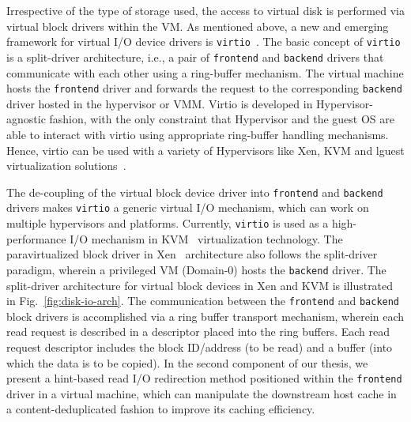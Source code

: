 Irrespective of the type of storage used, the access to virtual disk is
performed via virtual block drivers within the VM. 
As mentioned above, a new and emerging framework for 
virtual I/O device drivers is \texttt{virtio}~\cite{virtio}. 
The basic concept of \texttt{virtio} is a split-driver
architecture, i.e., a pair of \texttt{frontend} 
and \texttt{backend} drivers that communicate with each other using
a ring-buffer mechanism.
The virtual machine hosts the \texttt{frontend} driver and forwards the
request to the corresponding \texttt{backend} driver hosted in the 
hypervisor or VMM.
Virtio is developed in Hypervisor-agnostic fashion, with the only
constraint that Hypervisor and the guest OS are able to interact
with virtio using appropriate ring-buffer handling mechanisms.
Hence, virtio can be used
with a variety of Hypervisors like Xen, KVM and lguest virtualization 
solutions~\cite{virtio}.

The de-coupling of the virtual block device driver 
into \texttt{frontend} and \texttt{backend} drivers
makes \texttt{virtio}
a generic virtual I/O mechanism, which can work on multiple hypervisors
and platforms. Currently, \texttt{virtio} is used as a high-performance
I/O mechanism in KVM~\cite{kvm} virtualization technology. 
The paravirtualized block driver in Xen~\cite{xen} architecture also follows
the split-driver paradigm, wherein a privileged VM (Domain-0) hosts the 
\texttt{backend} driver. The split-driver architecture for virtual block devices
in Xen and KVM is illustrated in Fig.~\ref{fig:disk-io-arch}.
The communication between the \texttt{frontend} and \texttt{backend} block drivers is 
accomplished via a ring buffer transport mechanism, wherein each read
request is described in a descriptor placed into the ring buffers. Each
read request descriptor includes the block ID/address (to be read) and a 
buffer (into which the data is to be copied). 
In the second component of our thesis, we present a hint-based read
I/O redirection method positioned within the \texttt{frontend}
driver in a virtual machine, which can manipulate the downstream 
host cache in a content-deduplicated
fashion to improve its caching efficiency.
